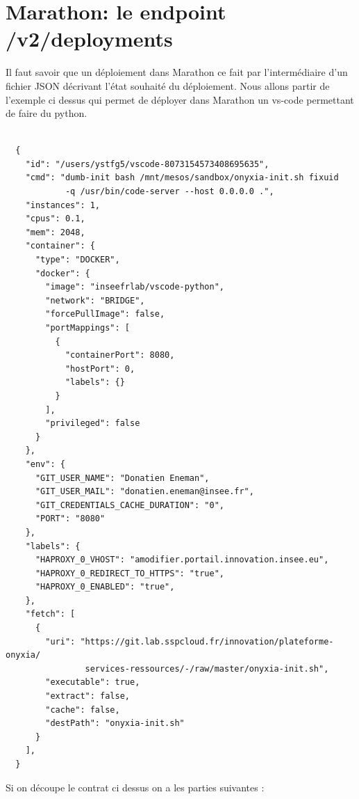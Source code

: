 \documentclass[11pt,fleqn]{book} %
\begin{document}
\section*{Marathon: le endpoint /v2/deployments}
Il faut savoir que un déploiement dans Marathon ce fait par l'intermédiaire d'un fichier JSON décrivant l'état souhaité du déploiement. Nous allons partir de l'exemple ci dessus qui permet de déployer dans Marathon un vs-code permettant de faire du python.
\begin{verbatim}

  {
    "id": "/users/ystfg5/vscode-8073154573408695635",
    "cmd": "dumb-init bash /mnt/mesos/sandbox/onyxia-init.sh fixuid 
            -q /usr/bin/code-server --host 0.0.0.0 .",
    "instances": 1,
    "cpus": 0.1,
    "mem": 2048,
    "container": {
      "type": "DOCKER",
      "docker": {
        "image": "inseefrlab/vscode-python",
        "network": "BRIDGE",
        "forcePullImage": false,
        "portMappings": [
          {
            "containerPort": 8080,
            "hostPort": 0,
            "labels": {}
          }
        ],
        "privileged": false
      }
    },
    "env": {
      "GIT_USER_NAME": "Donatien Eneman",
      "GIT_USER_MAIL": "donatien.eneman@insee.fr",
      "GIT_CREDENTIALS_CACHE_DURATION": "0",
      "PORT": "8080"
    },
    "labels": {
      "HAPROXY_0_VHOST": "amodifier.portail.innovation.insee.eu",
      "HAPROXY_0_REDIRECT_TO_HTTPS": "true",
      "HAPROXY_0_ENABLED": "true",
    },
    "fetch": [
      {
        "uri": "https://git.lab.sspcloud.fr/innovation/plateforme-onyxia/
                services-ressources/-/raw/master/onyxia-init.sh",
        "executable": true,
        "extract": false,
        "cache": false,
        "destPath": "onyxia-init.sh"
      }
    ],
  }

\end{verbatim}
Si on découpe le contrat ci dessus on a les parties suivantes : 
\end{document}

